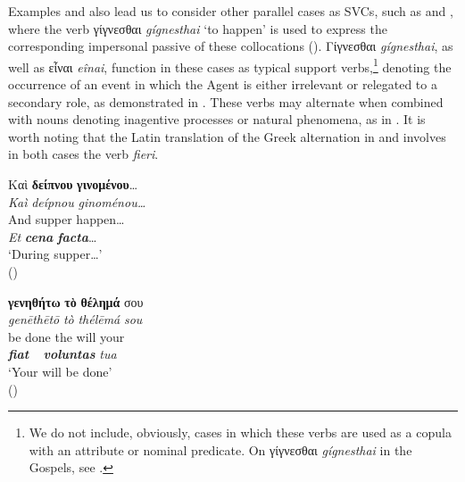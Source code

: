 \documentclass[output=paper,colorlinks,citecolor=brown]{langscibook}
\begin{document}
\z

\z

Examples  and  also lead us to consider other parallel cases
as SVCs, such as  and , where the verb γίγνεσθαι
\emph{gígnesthai} `to happen' is used to express the corresponding impersonal passive of
these collocations (\cite{JiménezLópezM.Dolores-2021724}). Γίγνεσθαι \emph{gígnesthai},
as well as εἶναι \textit{eînai}, function in these cases as typical support verbs,\footnote{We do not
  include, obviously, cases in which these verbs are used as a copula with an attribute or
  nominal predicate. On γίγνεσθαι \emph{gígnesthai} in the Gospels, see
  \citet{TronciLiana-2020488}.} denoting the occurrence of an event
\citep{GaatonDavid-2004326} in which the Agent is either irrelevant or relegated to a
secondary role, as demonstrated in . These verbs may alternate
when combined with nouns denoting inagentive processes or natural phenomena, as in
. It is worth noting that the Latin translation of the Greek
alternation in  and  involves in both cases the verb
\emph{fieri}.


\ea\label{ex:bj:5}

\ea\label{ex:bj:5a}

\gllll Καὶ \textbf{δείπνου} \textbf{γινομένου}\ldots{}\\
 \textit{Kaì} \textit{deípnou} \textit{ginoménou\ldots{}}\\
And supper happen\ldots{}\\
\emph{Et} \textit{\textbf{cena}} \textit{\textbf{facta}}\ldots{}\\
\glt `During supper\ldots' \\
\hspace*{\fill}()

\ex\label{ex:bj:5b}

\gllll \textbf{γενηθήτω} \textbf{τὸ} \textbf{θέλημά} σου\\
 \textit{genēthētō} \textit{tò} \textit{thélēmá} \textit{sou}\\
{be done} the will your\\
\textbf{\itshape fiat} ~ \textbf{\itshape voluntas} \textit{tua}\\
\glt `Your will be done' \\
\hspace*{\fill}()
\end{document}
